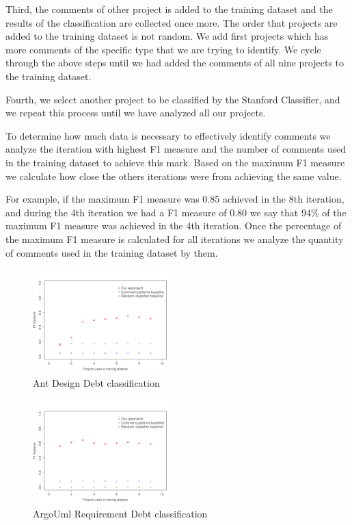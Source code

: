 Third, the comments of other project is added to the training dataset and the results of the classification are collected once more. The order that projects are added to the training dataset is not random. We add first projects which has more \SATD comments of the specific type that we are trying to identify. We cycle through the above steps until we had added the comments of all nine projects to the training dataset.

Fourth, we select another project to be classified by the Stanford Classifier, and we repeat this process until we have analyzed all our projects.
 
To determine how much data is necessary to effectively identify \SATD comments we analyze the iteration with highest F1 measure and the number of comments used in the training dataset to achieve this mark. Based on the maximum F1 measure we calculate how close the others iterations were from achieving the same value.

For example, if the maximum F1 measure was 0.85 achieved in the 8th iteration, and during the 4th iteration we had a F1 measure of 0.80 we say that 94\% of the maximum F1 measure was achieved in the 4th iteration. Once the percentage of the maximum F1 measure is calculated for all iterations we analyze the quantity of comments used in the training dataset by them.

\begin{figure}[t]
  \centering
  \includegraphics[width = 0.48\textwidth]{figures/design_ant.pdf}
  \vspace{-3mm}
  \caption{Ant Design Debt classification}
  \label{fig:design_ant_result}
\end{figure}

\begin{figure}[t]
  \centering
  \includegraphics[width = 0.48\textwidth]{figures/implementation_argo}
  \vspace{-3mm}
  \caption{ArgoUml Requirement Debt classification}
  \label{fig:implementation_argo_result}
\end{figure}

